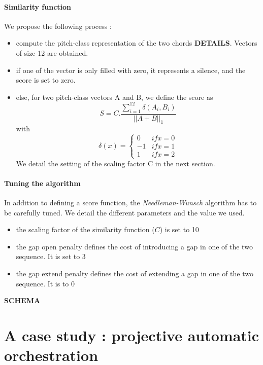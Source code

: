 \documentclass[twoside,twocolumn]{article}
\begin{document}
\paragraph{Similarity function}
We propose the following process :
\begin{itemize}
\item compute the pitch-class representation of the two chords \textbf{DETAILS}. Vectors of size 12 are obtained.
\item if one of the vector is only filled with zero, it represents a silence, and the score is set to zero.
\item else, for two pitch-class vectors A and B, we define the score as 
\begin{equation}
S =	C . \frac{\sum_{i=1}^{12} \delta(A_i , B_i)}{||A+B||_1}
\end{equation}
with
\[\delta(x) =
    \begin{cases*}
      0 & if x = 0\\
      -1 & if x = 1\\
      1 & if x = 2
    \end{cases*} 
\]
We detail the setting of the scaling factor C in the next section.
\end{itemize}

\paragraph{Tuning the algorithm}
In addition to defining a score function, the \textit{Needleman-Wunsch} algorithm has to be carefully tuned. We detail the different parameters and the value we used.
\begin{itemize}
\item the scaling factor of the similarity function ($C$) is set to 10
\item the gap open penalty defines the cost of introducing a gap in one of the two sequence. It is set to 3
\item the gap extend penalty defines the cost of extending a gap in one of the two sequence. It is to 0
\end{itemize}



\textbf{SCHEMA}

\section{A case study : projective automatic orchestration}







\end{document}
